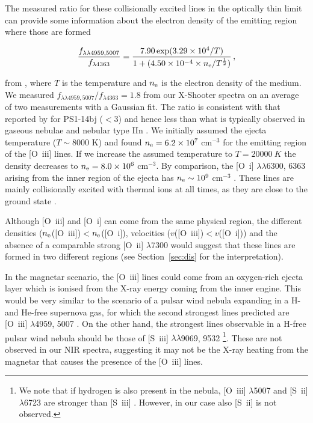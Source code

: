 \documentclass[useAMS,usenatbib]{mn2e}
\def\an{LSQ14an}
\def\oiii{[O~{\sc iii}]}
\begin{document}
The measured ratio for these collisionally excited lines in the optically thin limit can provide some information about the electron density of the emitting region where those are formed 

\begin{equation}
\frac{f_{\rm \lambda\lambda4959,5007}}{f_{\rm \lambda4363}} = \frac{7.90\, {\rm exp}(3.29 \times 10^{4}/T)}{1+(4.50 \times 10^{-4} \times n_{\rm e}/T^\frac{1}{2})}\, ,
\end{equation}

from \citet{of}, where $T$ is the temperature and $n_{\rm e}$ is the electron density of the medium. We measured 
$f_{ \lambda\lambda4959,5007}/f_{ \lambda4363} =1.8$ from our X-Shooter spectra on an average of two measurements with a Gaussian fit. The ratio is consistent with that reported by \citet{lu16} for PS1-14bj ($<3$) and hence less than what is typically observed in gaseous nebulae \citep{of} and nebular type IIn \citep[e.g. SN~1995N,][]{fr02}. 
We initially assumed the ejecta temperature ($T\sim$8000 K) and found $n_{\rm e}=6.2\times 10^7$ cm$^{-3}$ for the emitting region of the \oiii\/ lines.
 If we increase the assumed temperature to $T=20000~K$ the density decreases to $n_{\rm e}=8.0\times 10^6$ cm$^{-3}$. 
By comparison, 
the [O~{\sc i}] $\lambda\lambda$6300, 6363 arising from the inner region of the ejecta has $n_{\rm e}\sim10^9$ cm$^{-3}$ \citep[as measured for late spectra of \an\/, $\sim$200d later, by][and having taken in account that density evolves as $t^{-3}$]{je16}. These lines are mainly collisionally excited with thermal ions 
at all times, as they are close to the ground state \citep[see][for a more in depth analysis]{je16}.  

Although [O~{\sc iii}] and [O~{\sc i}] can come from the same physical region, the different densities ($n_{\rm e}$(\oiii)$<$$n_{\rm e}$([O~{\sc i}]), velocities ($v$(\oiii)$<$$v$([O~{\sc i}])) and the absence of a comparable strong [O~{\sc ii}] $\lambda$7300 would suggest that these lines are formed in two different regions (see Section~\ref{sec:dis} for the interpretation).

In the magnetar scenario, the \oiii\/ lines could come from an oxygen-rich ejecta layer which is ionised from the X-ray energy coming from the inner engine. This would be very similar to the scenario of a pulsar wind nebula expanding in a H- and He-free supernova gas, for which the second strongest lines predicted are \oiii\/ $\lambda$4959, 5007 \citep{ch92}. On the other hand, the strongest lines observable in a H-free pulsar wind nebula should be those of [S~{\sc iii}] $\lambda\lambda$9069, 9532 \footnote{We note that if hydrogen is also present in the nebula, \oiii\/ $\lambda$5007 and [S~{\sc ii}] $\lambda$6723 are stronger than [S~{\sc iii}] \citep{ki89}. However, in our case also [S~{\sc ii}] is not observed.}. 
These are not observed in our NIR spectra, suggesting it may not  be the X-ray heating from the magnetar that causes the presence of the \oiii\/ lines. 
\end{document}
